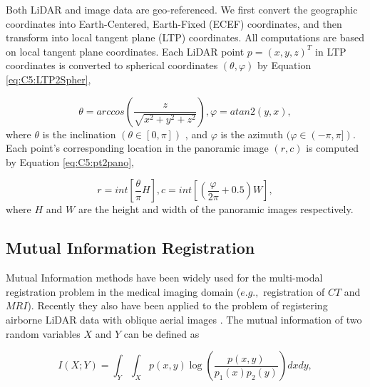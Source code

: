Both LiDAR and image data are geo-referenced. We first convert the geographic coordinates into Earth-Centered, Earth-Fixed (ECEF) coordinates, and then transform into local tangent plane (LTP) coordinates. All computations are based on local tangent plane coordinates. Each LiDAR point $ p = (x,y,z)^T $ in LTP coordinates is converted to spherical coordinates $(\theta, \varphi)$ by 
Equation \ref{eq:C5:LTP2Spher},

\begin{equation}
   \theta = arccos(\frac{z}{\sqrt{x^2+y^2+z^2}}), \varphi = atan2(y,x),
\label{eq:C5:LTP2Spher}
\end{equation} 
where $\theta$ is the inclination $ (\theta \in [0, \pi])  $ , and $ \varphi$ is the azimuth $ (\varphi \in (-\pi, \pi]) $. Each point's corresponding location in the panoramic image $ (r, c)$ is computed by Equation \ref{eq:C5:pt2pano},

\begin{equation}
 r = int[\frac{\theta}{\pi}H], c = int [(\frac{\varphi}{2\pi}+0.5)W ],  
 \label{eq:C5:pt2pano}
\end{equation} 
where $H$ and $W$ are the height and width of the panoramic images respectively.

\subsection{Mutual Information Registration}

Mutual Information methods have been widely used for the multi-modal registration problem in the medical imaging domain ($e.g.,$  registration of $CT$ and $MRI$). Recently they also have been applied to the problem of registering airborne LiDAR data with oblique aerial images \cite{MastinFisher09}. The mutual information of two random variables $X$ and $Y$ can be defined as

\begin{equation}
I(X; Y) = \int_Y \int_X p(x, y) \log(\frac{p(x, y)}{p_1(x)p_2(y)})dx dy,
\label{eq:C5:MI_definition}
\end{equation}    

